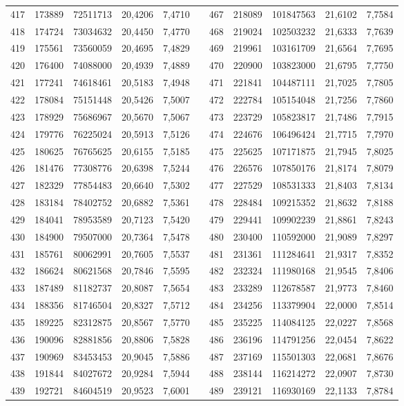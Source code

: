 \begin{longtable}{rrrrrrrrrrr}
417&173889&72511713&20,4206&7,4710&&467&218089&101847563&21,6102&7,7584\\
418&174724&73034632&20,4450&7,4770&&468&219024&102503232&21,6333&7,7639\\
419&175561&73560059&20,4695&7,4829&&469&219961&103161709&21,6564&7,7695\\
420&176400&74088000&20,4939&7,4889&&470&220900&103823000&21,6795&7,7750\\
421&177241&74618461&20,5183&7,4948&&471&221841&104487111&21,7025&7,7805\\
422&178084&75151448&20,5426&7,5007&&472&222784&105154048&21,7256&7,7860\\
423&178929&75686967&20,5670&7,5067&&473&223729&105823817&21,7486&7,7915\\
424&179776&76225024&20,5913&7,5126&&474&224676&106496424&21,7715&7,7970\\
425&180625&76765625&20,6155&7,5185&&475&225625&107171875&21,7945&7,8025\\
426&181476&77308776&20,6398&7,5244&&476&226576&107850176&21,8174&7,8079\\
427&182329&77854483&20,6640&7,5302&&477&227529&108531333&21,8403&7,8134\\
428&183184&78402752&20,6882&7,5361&&478&228484&109215352&21,8632&7,8188\\
429&184041&78953589&20,7123&7,5420&&479&229441&109902239&21,8861&7,8243\\
430&184900&79507000&20,7364&7,5478&&480&230400&110592000&21,9089&7,8297\\
431&185761&80062991&20,7605&7,5537&&481&231361&111284641&21,9317&7,8352\\
432&186624&80621568&20,7846&7,5595&&482&232324&111980168&21,9545&7,8406\\
433&187489&81182737&20,8087&7,5654&&483&233289&112678587&21,9773&7,8460\\
434&188356&81746504&20,8327&7,5712&&484&234256&113379904&22,0000&7,8514\\
435&189225&82312875&20,8567&7,5770&&485&235225&114084125&22,0227&7,8568\\
436&190096&82881856&20,8806&7,5828&&486&236196&114791256&22,0454&7,8622\\
437&190969&83453453&20,9045&7,5886&&487&237169&115501303&22,0681&7,8676\\
438&191844&84027672&20,9284&7,5944&&488&238144&116214272&22,0907&7,8730\\
439&192721&84604519&20,9523&7,6001&&489&239121&116930169&22,1133&7,8784\\

\end{longtable}
